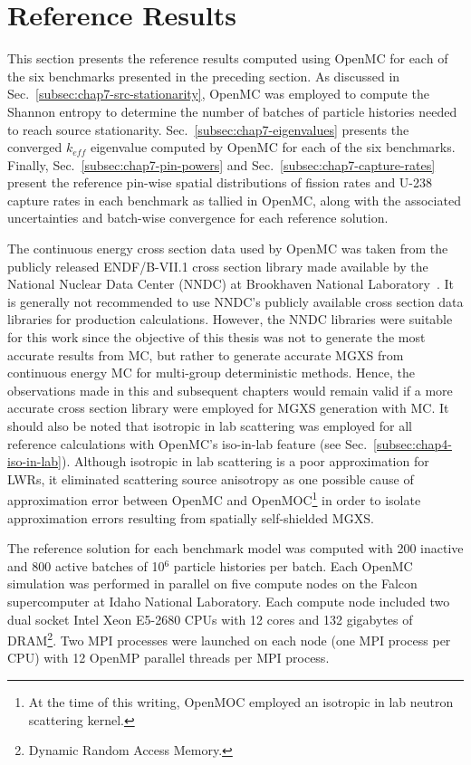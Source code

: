 \section{Reference Results}
\label{sec:chap7-ref-results}

This section presents the reference results computed using OpenMC for each of the six benchmarks presented in the preceding section. As discussed in Sec.~\ref{subsec:chap7-src-stationarity}, OpenMC was employed to compute the Shannon entropy to determine the number of batches of particle histories needed to reach source stationarity. Sec.~\ref{subsec:chap7-eigenvalues} presents the converged $k_{eff}$ eigenvalue computed by OpenMC for each of the six benchmarks. Finally, Sec.~\ref{subsec:chap7-pin-powers} and Sec.~\ref{subsec:chap7-capture-rates} present the reference pin-wise spatial distributions of fission rates and U-238 capture rates in each benchmark as tallied in OpenMC, along with the associated uncertainties and batch-wise convergence for each reference solution.

The continuous energy cross section data used by OpenMC was taken from the publicly released ENDF/B-VII.1 cross section library made available by the National Nuclear Data Center (NNDC) at Brookhaven National Laboratory~\cite{nndc2016endf}. It is generally not recommended to use NNDC's publicly available cross section data libraries for production calculations. However, the NNDC libraries were suitable for this work since the objective of this thesis was not to generate the most accurate results from \ac{MC}, but rather to generate accurate \ac{MGXS} from continuous energy \ac{MC} for multi-group deterministic methods. Hence, the observations made in this and subsequent chapters would remain valid if a more accurate cross section library were employed for \ac{MGXS} generation with \ac{MC}. It should also be noted that isotropic in lab scattering was employed for all reference calculations with OpenMC's iso-in-lab feature (see Sec.~\ref{subsec:chap4-iso-in-lab}). Although isotropic in lab scattering is a poor approximation for \acp{LWR}, it eliminated scattering source anisotropy as one possible cause of approximation error between OpenMC and OpenMOC\footnote{At the time of this writing, OpenMOC employed an isotropic in lab neutron scattering kernel.} in order to isolate approximation errors resulting from spatially self-shielded \ac{MGXS}.

The reference solution for each benchmark model was computed with 200 inactive and 800 active batches of 10$^6$ particle histories per batch. Each OpenMC simulation was performed in parallel on five compute nodes on the Falcon supercomputer at Idaho National Laboratory. Each compute node included two dual socket Intel Xeon E5-2680 CPUs with 12 cores and 132 gigabytes of DRAM\footnote{Dynamic Random Access Memory.}. Two MPI processes were launched on each node (one MPI process per CPU) with 12 OpenMP parallel threads per MPI process.

